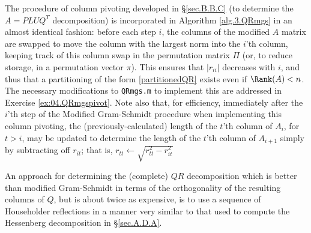 The procedure of column pivoting developed in \S \ref{sec.B.B.C} (to determine the $A=PLU\!Q^T$ decomposition)
is incorporated in Algorithm \ref{alg.3.QRmgs} in an almost identical fashion: before each step $i$,
the columns of the modified $A$ matrix are swapped to move the column with the largest
norm into the $i$'th column, keeping track of this column swap in the permutation matrix $\Pi$ (or, to reduce storage,
in a permutation vector $\pi$). This ensures that $|r_{ii}|$ decreases with $i$,
and thus that a partitioning of the form \eqref{partitionedQR} exists even if $\Rank(A)<n$.  The necessary modifications to {\tt QRmgs.m}
to implement this are addressed in Exercise \ref{ex:04.QRmgspivot}.  
Note also that, for efficiency, immediately after the $i$'th step of the Modified Gram-Schmidt procedure when implementing
this column pivoting, the (previously-calculated)
length of the $t$'th column of $A_{i}$, for $t> i$, may be updated to determine the length of the $t$'th
column of $A_{i+1}$ simply by subtracting off $r_{i t}$; that is, $r_{tt} \leftarrow \sqrt{r_{tt}^2 - r_{it}^2}$ 


\noindent An approach for determining the (complete) $QR$ decomposition which is
better than modified Gram-Schmidt in terms of the orthogonality of the
resulting columns of $Q$, but is about twice as expensive, is to use a
sequence of Householder reflections in a manner very similar to that
used to compute the Hessenberg decomposition in \S \ref{sec.A.D.A}.

